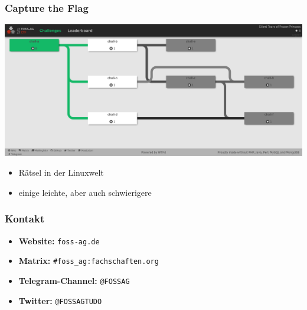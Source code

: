 \documentclass[12pt,utf8]{beamer}
\begin{document}
	\begin{frame}
		\frametitle{Capture the Flag}
		\includegraphics[width=\linewidth]{resources/screenshot_ctf.png}
		\begin{itemize}
			\item Rätsel in der Linuxwelt\\
			\vspace{0.5cm}
			\item einige leichte, aber auch schwierigere
		\end{itemize}
	\end{frame}
	
	\begin{frame}
		\frametitle{Kontakt}

		
		\begin{itemize}%
			\item \textbf{Website:} \texttt{foss-ag.de}
			\vspace{0.5cm}
			\item \textbf{Matrix:} \texttt{\#foss\_ag:fachschaften.org}
			\vspace{0.5cm}
			\item \textbf{Telegram-Channel:} \texttt{@FOSSAG}
			\vspace{0.5cm}
			\item \textbf{Twitter:} \texttt{@FOSSAGTUDO}	
			
		\end{itemize}
	\end{frame}
\end{document}
